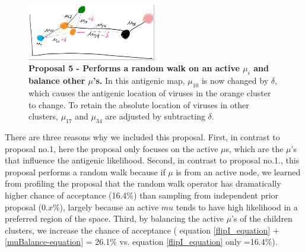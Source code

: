 \documentclass[11pt,oneside,letterpaper]{article}
\begin{document}
\begin{figure}[h]
	\centering		
	\includegraphics[width=0.5\textwidth]{figures/walkAndBalance}
	\caption{\textbf{Proposal 5 - Performs a random walk on an active $\mu_i$ and balance other $\mu$'s.} 
In this antigenic map, $\mu_{10}$ is now changed by $\delta$, which causes the antigenic location of viruses in the orange cluster to change. 
To retain the absolute location of viruses in other clusters,  $\mu_{17}$ and $\mu_{34}$ are adjusted by subtracting $\delta$.
	} 
	\label{walkAndBalance} 
\end{figure}


There are three reasons why we included this proposal.
First, in contrast to proposal no.1, here the proposal only focuses on the active $\mu$s, which are the $\mu$'s that influence the antigenic likelihood.
Second, in contrast to proposal no.1., this proposal performs a random walk because if $\mu$ is from an active node, we learned from profiling the proposal that the random walk operator has dramatically higher chance of acceptance (16.4$\%$) than sampling from independent prior proposal ($0.x\%$), largely because an active $mu$ tends to have high likelihood in a preferred region of the space.
Third, by balancing the active $\mu$'s of the children clusters, we increase the chance of acceptance ( equation \ref{flipI_equation} + \ref{muBalance-equation} = 26.1$\%$ vs. equation \ref{flipI_equation} only =16.4$\%$).
\end{document}
